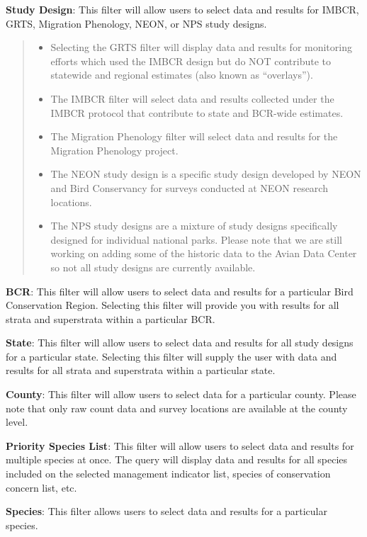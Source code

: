 \documentclass[
  letterpaper,
  DIV=11,
  numbers=noendperiod,
  oneside]{scrreprt}
\begin{document}
\textbf{Study Design}: This filter will allow users to select data and
results for IMBCR, GRTS, Migration Phenology, NEON, or NPS study
designs.

\begin{quote}
\begin{itemize}
\item
  Selecting the GRTS filter will display data and results for monitoring
  efforts which used the IMBCR design but do NOT contribute to statewide
  and regional estimates (also known as ``overlays'').
\item
  The IMBCR filter will select data and results collected under the
  IMBCR protocol that contribute to state and BCR-wide estimates.
\item
  The Migration Phenology filter will select data and results for the
  Migration Phenology project.
\item
  The NEON study design is a specific study design developed by NEON and
  Bird Conservancy for surveys conducted at NEON research locations.
\item
  The NPS study designs are a mixture of study designs specifically
  designed for individual national parks. Please note that we are still
  working on adding some of the historic data to the Avian Data Center
  so not all study designs are currently available.
\end{itemize}
\end{quote}

\textbf{BCR}: This filter will allow users to select data and results
for a particular Bird Conservation Region. Selecting this filter will
provide you with results for all strata and superstrata within a
particular BCR.

\textbf{State}: This filter will allow users to select data and results
for all study designs for a particular state. Selecting this filter will
supply the user with data and results for all strata and superstrata
within a particular state.

\textbf{County}: This filter will allow users to select data for a
particular county. Please note that only raw count data and survey
locations are available at the county level.

\textbf{Priority Species List}: This filter will allow users to select
data and results for multiple species at once. The query will display
data and results for all species included on the selected management
indicator list, species of conservation concern list, etc.

\textbf{Species}: This filter allows users to select data and results
for a particular species.
\end{document}

